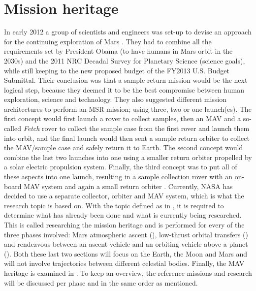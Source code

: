 \chapter{Mission heritage} %
\label{ch:missher}
In early 2012 a group of scientists and engineers was set-up to devise an approach for the continuing exploration of Mars \cite{mppg2012}. They had to combine all the requirements set by President Obama (to have humans in Mars orbit in the 2030s) and the 2011 NRC Decadal Survey for Planetary Science (science goals), while still keeping to the new proposed budget of the FY2013 U.S. Budget Submittal. Their conclusion was that a sample return mission would be the next logical step, because they deemed it to be the best compromise between human exploration, science and technology. They also suggested different mission architectures to perform an \ac{MSR} mission; using three, two or one launch(es). The first concept would first launch a rover to collect samples, then an \ac{MAV} and a so-called \textit{Fetch} rover to collect the sample case from the first rover and launch them into orbit, and the final launch would then sent a sample return orbiter to collect the \ac{MAV}/sample case and safely return it to Earth. The second concept would combine the last two launches into one using a smaller return orbiter propelled by a solar electric propulsion system. Finally, the third concept was to put all of these aspects into one launch, resulting in a sample collection rover with an on-board \ac{MAV} system and again a small return orbiter \cite{mppg2012}. Currently, NASA has decided to use a separate collector, orbiter and \ac{MAV} system, which is what the research topic is based on. With the topic defined as in , it is required to determine what has already been done and what is currently being researched. This is called researching the mission heritage and is performed for every of the three phases involved: Mars atmospheric ascent (), low-thrust orbital transfers () and rendezvous between an ascent vehicle and an orbiting vehicle above a planet (). Both these last two sections will focus on the Earth, the Moon and Mars and will not involve trajectories between different celestial bodies. Finally, the \ac{MAV} heritage is examined in . To keep an overview, the reference missions and research will be discussed per phase and in the same order as mentioned. 

